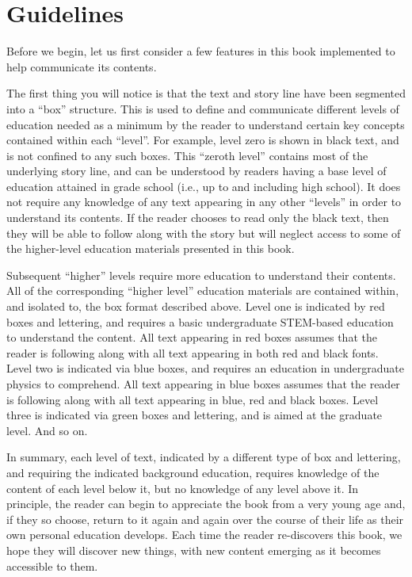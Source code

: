 \documentclass[main.tex]{subfiles}
\begin{document}
\section{Guidelines} \label{guide}

\par \nar Before we begin, let us first consider a few features in this book implemented to help communicate its contents.  


The first thing you will notice is that the text and story line have been segmented into a “box” structure.  This is used to define and communicate different levels of education needed as a minimum by the reader to understand certain key concepts contained within each “level”.  For example, level zero is shown in black text, and is not confined to any such boxes.  This “zeroth level” contains most of the underlying story line, and can be understood by readers having a base level of education attained in grade school (i.e., up to and including high school).  It does not require any knowledge of any text appearing in any other “levels” in order to understand its contents.  If the reader chooses to read only the black text, then they will be able to follow along with the story but will neglect access to some of the higher-level education materials presented in this book.  

Subsequent “higher” levels require more education to understand their contents.  All of the corresponding “higher level” education materials are contained within, and isolated to, the box format described above.  Level one is indicated by red boxes and lettering, and requires a basic undergraduate STEM-based education to understand the content.  All text appearing in red boxes assumes that the reader is following along with all text appearing in both red and black fonts.  Level two is indicated via blue boxes, and requires an education in undergraduate physics to comprehend.  All text appearing in blue boxes assumes that the reader is following along with all text appearing in blue, red and black boxes.  Level three is indicated via green boxes  and lettering, and is aimed at the graduate level.  And so on.  

In summary, each level of text, indicated by a different type of box and lettering, and requiring the indicated background education, requires knowledge of the content of each level below it, but no knowledge of any level above it.  In principle, the reader can begin to appreciate the book from a very young age and, if they so choose, return to it again and again over the course of their life as their own personal education develops.  Each time the reader re-discovers this book, we hope they will discover new things, with new content emerging as it becomes accessible to them.
\end{document}
